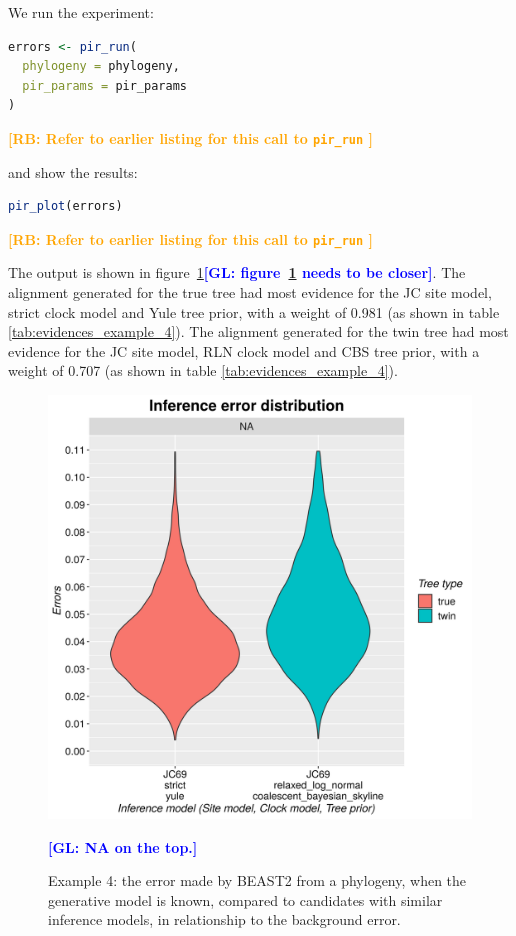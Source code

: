 \documentclass{article}
\newcommand{\giovanni}[1]{\textcolor{blue}{\textbf{[GL: #1]}}}
\newcommand{\richel}[1]{\textcolor{orange}{\textbf{[RB: #1]}}}
\begin{document}
We run the experiment:

\begin{lstlisting}[language=R, floatplacement=ht, frame=single]
errors <- pir_run(
  phylogeny = phylogeny,
  pir_params = pir_params
)
\end{lstlisting}
\richel{
  Refer to earlier listing for this call to \texttt{pir\_run}
}

and show the results:

\begin{lstlisting}[language=R, floatplacement=ht, frame=single]
pir_plot(errors)
\end{lstlisting}
\richel{
  Refer to earlier listing for this call to \texttt{pir\_run}
}

The output is shown in figure~\ref{fig:example_4}\giovanni{figure~\ref{fig:example_4} needs to be closer}. The alignment
generated for the true tree had most evidence for the JC site model,
strict clock model and Yule tree prior, 
with a weight of 0.981 (as 
shown in table \ref{tab:evidences_example_4}). 
The alignment
generated for the twin tree had most evidence for the JC site model,
RLN clock model and CBS tree prior,
with a weight of 0.707 (as 
shown in table \ref{tab:evidences_example_4}). 

\begin{figure}[ht]
  \includegraphics[width=\textwidth]{example_4/errors.png}
  \caption{
    Example 4: the error made by BEAST2 from a phylogeny, when the generative 
    model is known, compared to candidates with similar inference models, in 
    relationship to the background error.
  }
  \label{fig:example_4}
  \giovanni{NA on the top.}
\end{figure}
\end{document}
